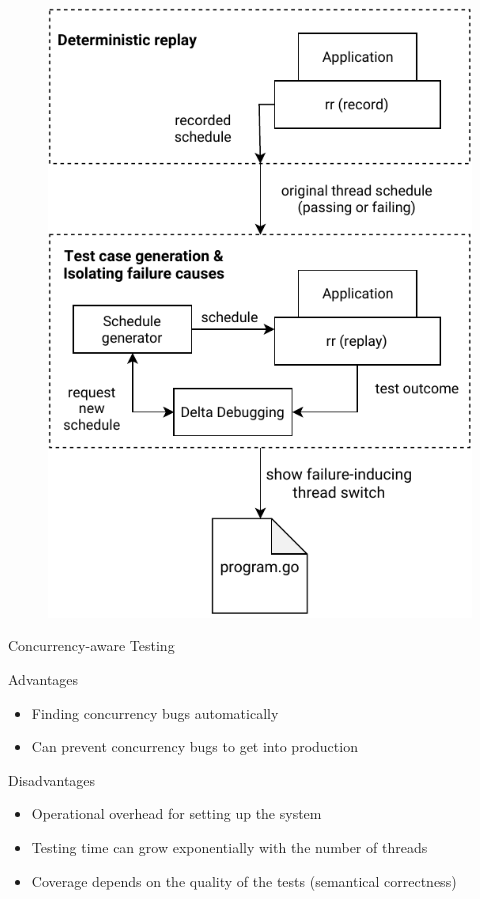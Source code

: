 \documentclass[english,aspectratio=43,t]{beamer}
\begin{document}
\begin{frame}
\begin{figure}
    \includegraphics[height=\textheight]{../src/figures/Concurrency-Testing.pdf}
\end{figure}
\end{frame}

\begin{frame}[c]{Concurrency-aware Testing}
    \centering
    \begin{exampleblock}{Advantages}
        \begin{itemize}
            \item Finding concurrency bugs automatically
            \item Can prevent concurrency bugs to get into production
        \end{itemize}
    \end{exampleblock}
    \begin{alertblock}{Disadvantages}
        \begin{itemize}
            \item Operational overhead for setting up the system
            \item Testing time can grow exponentially with the number of threads
            \item Coverage depends on the quality of the tests (semantical correctness)
        \end{itemize}
    \end{alertblock}
\end{frame}
\end{document}
